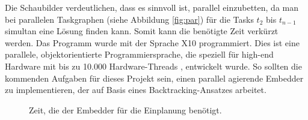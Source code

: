 Die Schaubilder verdeutlichen, dass es sinnvoll ist, parallel einzubetten, da man bei parallelen Taskgraphen (siehe Abbildung \ref{fig:par}) für die Tasks $t_2$ bis $t_{n-1}$ simultan eine Lösung finden kann. Somit kann die benötigte Zeit verkürzt werden. Das Programm wurde mit der Sprache  X10 \cite{x10}  programmiert. Dies ist eine parallele, objektorientierte Programmiersprache, die speziell für high-end Hardware mit bis zu 10.000 Hardware-Threads \cite{x10Spezi} , entwickelt wurde. So sollten die  kommenden Aufgaben für dieses Projekt sein, einen parallel agierende Embedder zu implementieren, der auf Basis eines Backtracking-Ansatzes \cite{jaeger} arbeitet.
\begin{figure}
\centering
\caption{Zeit, die der Embedder für die Einplanung benötigt.}
\label{einbettungszeit}
\end{figure}  





